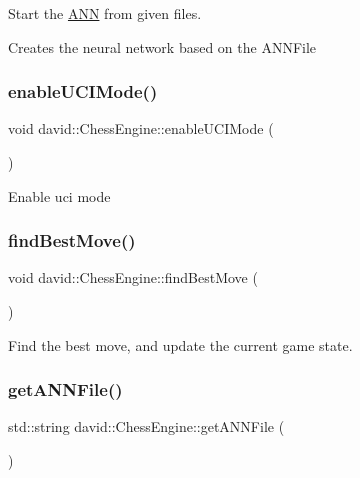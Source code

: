 Start the \hyperlink{classdavid_1_1ANN}{A\+NN} from given files.

Creates the neural network based on the A\+N\+N\+File \mbox{\label{classdavid_1_1ChessEngine_a87d97f18682651d669bd978e45c40add}} 
\subsubsection{\texorpdfstring{enable\+U\+C\+I\+Mode()}{enableUCIMode()}}
{\footnotesize\ttfamily void david\+::\+Chess\+Engine\+::enable\+U\+C\+I\+Mode (\begin{DoxyParamCaption}{ }\end{DoxyParamCaption})}

Enable uci mode \mbox{\label{classdavid_1_1ChessEngine_a8a7024be604538049a4606be80ee054f}} 
\subsubsection{\texorpdfstring{find\+Best\+Move()}{findBestMove()}}
{\footnotesize\ttfamily void david\+::\+Chess\+Engine\+::find\+Best\+Move (\begin{DoxyParamCaption}{ }\end{DoxyParamCaption})}

Find the best move, and update the current game state. \mbox{\label{classdavid_1_1ChessEngine_a364e98f32632c0669585ab464f8b6532}} 
\subsubsection{\texorpdfstring{get\+A\+N\+N\+File()}{getANNFile()}}
{\footnotesize\ttfamily std\+::string david\+::\+Chess\+Engine\+::get\+A\+N\+N\+File (\begin{DoxyParamCaption}{ }\end{DoxyParamCaption})}

